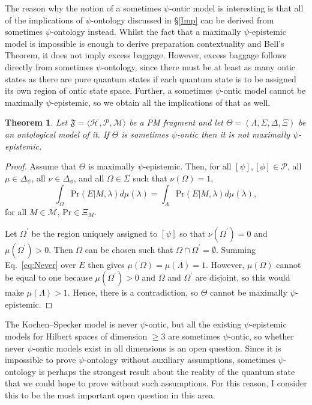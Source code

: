 \documentclass[DIV=calc,fontsize=12pt]{scrartcl} %
\theoremstyle{definition}
\theoremstyle{plain}
\newtheorem{theorem}[definition]{Theorem}
\newcommand{\Proj}[1]{\ensuremath{\left [ #1 \right ]}}
\newcommand{\Hilb}[1][]{\ensuremath{\mathcal{H}_{#1}}}
\begin{document}
The reason why the notion of a sometimes $\psi$-ontic model is
interesting is that all of the implications of $\psi$-ontology
discussed in \S\ref{Imp} can be derived from sometimes $\psi$-ontology
instead.  Whilst the fact that a maximally $\psi$-epistemic model is
impossible is enough to derive preparation contextuality and Bell's
Theorem, it does not imply excess baggage.  However, excess baggage
follows directly from sometimes $\psi$-ontology, since there must be
at least as many ontic states as there are pure quantum states if each
quantum state is to be assigned its own region of ontic state space.
Further, a sometimes $\psi$-ontic model cannot be maximally
$\psi$-epistemic, so we obtain all the implications of that as well.

\begin{theorem}
Let $\mathfrak{F} = \langle \Hilb, \mathcal{P}, \mathcal{M} \rangle$
be a PM fragment and let $\Theta = (\Lambda, \Sigma, \Delta, \Xi)$ be
an ontological model of it.  If $\Theta$ is sometimes $\psi$-ontic then
it is not maximally $\psi$-epistemic.
\end{theorem}
\begin{proof}
Assume that $\Theta$ is maximally $\psi$-epistemic.  Then, for all
$\Proj{\psi}, \Proj{\phi} \in \mathcal{P}$, all $\mu \in
\Delta_{\psi}$, all $\nu \in \Delta_{\phi}$, and all $\Omega \in
\Sigma$ such that $\nu(\Omega) = 1$,
\begin{equation}
\label{eq:Never}
\int_{\Omega} \text{Pr}(E|M,\lambda)d\mu(\lambda) = \int_{\Lambda}
\text{Pr}(E|M,\lambda)d\mu(\lambda),
\end{equation}
for all $M \in \mathcal{M}$, $\text{Pr} \in \Xi_M$.

Let $\Omega^{\prime}$ be the region uniquely assigned to
$\Proj{\psi}$ so that $\nu(\Omega^{\prime}) = 0$ and
$\mu(\Omega^{\prime}) > 0$.  Then $\Omega$ can be chosen such that
$\Omega \cap \Omega^{\prime} = \emptyset$.  Summing
Eq.~\eqref{eq:Never} over $E$ then gives $\mu(\Omega) = \mu(\Lambda)
= 1$.  However, $\mu(\Omega)$ cannot be equal to one because
$\mu(\Omega^{\prime}) > 0$ and $\Omega$ and $\Omega^{\prime}$ are
disjoint, so this would make $\mu(\Lambda) > 1$.  Hence, there is a
contradiction, so $\Theta$ cannot be maximally $\psi$-epistemic.
\end{proof}

The Kochen--Specker model is never $\psi$-ontic, but all the existing
$\psi$-epistemic models for Hilbert spaces of dimension $\geq 3$ are
sometimes $\psi$-ontic, so whether never $\psi$-ontic models exist in
all dimensions is an open question.  Since it is impossible to prove
$\psi$-ontology without auxiliary assumptions, sometimes
$\psi$-ontology is perhaps the strongest result about the reality of
the quantum state that we could hope to prove without such
assumptions.  For this reason, I consider this to be the most
important open question in this area.
\end{document}
